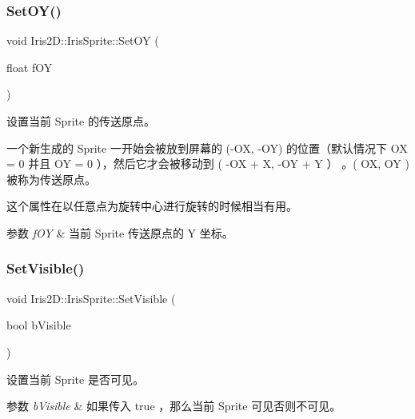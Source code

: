 \subsubsection{\texorpdfstring{Set\+O\+Y()}{SetOY()}}
{\footnotesize\ttfamily void Iris2\+D\+::\+Iris\+Sprite\+::\+Set\+OY (\begin{DoxyParamCaption}\item[{float}]{f\+OY }\end{DoxyParamCaption})}



设置当前 Sprite 的传送原点。 

一个新生成的 Sprite 一开始会被放到屏幕的 (-\/\+OX, -\/\+OY) 的位置（默认情况下 OX = 0 并且 OY = 0 ），然后它才会被移动到 ( -\/\+OX + X, -\/\+OY + Y ） 。( O\+X, O\+Y ) 被称为传送原点。

这个属性在以任意点为旋转中心进行旋转的时候相当有用。 
\begin{DoxyParams}{参数}
{\em f\+OY} & 当前 Sprite 传送原点的 Y 坐标。 \\
\hline
\end{DoxyParams}
\mbox{\label{class_iris2_d_1_1_iris_sprite_aae4592abf843276138b5805eb030575e}} 
\subsubsection{\texorpdfstring{Set\+Visible()}{SetVisible()}}
{\footnotesize\ttfamily void Iris2\+D\+::\+Iris\+Sprite\+::\+Set\+Visible (\begin{DoxyParamCaption}\item[{bool}]{b\+Visible }\end{DoxyParamCaption})}



设置当前 Sprite 是否可见。 


\begin{DoxyParams}{参数}
{\em b\+Visible} & 如果传入 true ，那么当前 Sprite 可见否则不可见。 \\
\hline
\end{DoxyParams}
\mbox{\label{class_iris2_d_1_1_iris_sprite_adfabb55dba020af9fe324d4abfa7f07a}} 
